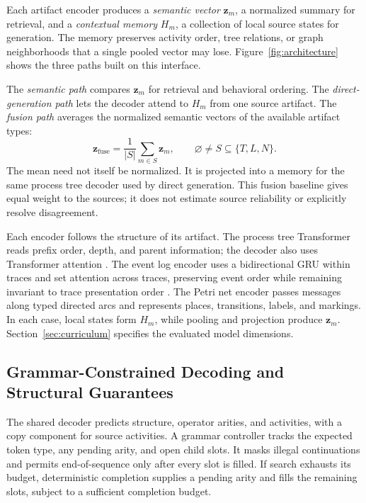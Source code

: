 \documentclass[mathematics,article,submit,moreauthors]{Definitions/mdpi}
\newcommand{\vect}[1]{\boldsymbol{#1}}
\begin{document}
Each artifact encoder produces a \emph{semantic vector} $\vect z_m$, a normalized summary for retrieval, and a \emph{contextual memory} $H_m$, a collection of local source states for generation. The memory preserves activity order, tree relations, or graph neighborhoods that a single pooled vector may lose. Figure~\ref{fig:architecture} shows the three paths built on this interface.

The \emph{semantic path} compares $\vect z_m$ for retrieval and behavioral ordering. The \emph{direct-generation path} lets the decoder attend to $H_m$ from one source artifact. The \emph{fusion path} averages the normalized semantic vectors of the available artifact types:
\begin{equation}
\vect z_{\mathrm{fuse}}=\frac{1}{|S|}\sum_{m\in S}\vect z_m,
\qquad \varnothing\ne S\subseteq\{T,L,N\}.
\label{eq:fusion}
\end{equation}
The mean need not itself be normalized. It is projected into a memory for the same process tree decoder used by direct generation. This fusion baseline gives equal weight to the sources; it does not estimate source reliability or explicitly resolve disagreement.



Each encoder follows the structure of its artifact. The process tree Transformer reads prefix order, depth, and parent information; the decoder also uses Transformer attention \cite{Vaswani2017}. The event log encoder uses a bidirectional GRU within traces and set attention across traces, preserving event order while remaining invariant to trace presentation order \cite{Lee2019}. The Petri net encoder passes messages along typed directed arcs and represents places, transitions, labels, and markings. In each case, local states form $H_m$, while pooling and projection produce $\vect z_m$. Section~\ref{sec:curriculum} specifies the evaluated model dimensions.

\subsection{Grammar-Constrained Decoding and Structural Guarantees}\label{sec:decoder-guarantees}

The shared decoder predicts structure, operator arities, and activities, with a copy component for source activities. A grammar controller tracks the expected token type, any pending arity, and open child slots. It masks illegal continuations and permits end-of-sequence only after every slot is filled. If search exhausts its budget, deterministic completion supplies a pending arity and fills the remaining slots, subject to a sufficient completion budget.
\end{document}
